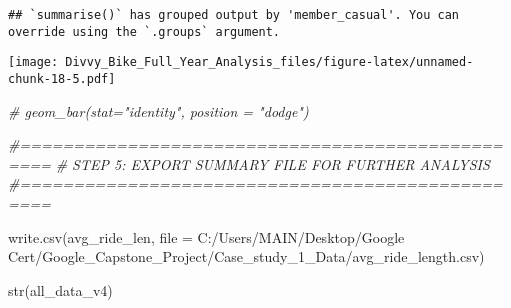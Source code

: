 \documentclass[
]{article}
\newenvironment{Shaded}{\begin{snugshade}}{\end{snugshade}}
\newcommand{\AttributeTok}[1]{\textcolor[rgb]{0.77,0.63,0.00}{#1}}
\newcommand{\CommentTok}[1]{\textcolor[rgb]{0.56,0.35,0.01}{\textit{#1}}}
\newcommand{\FunctionTok}[1]{\textcolor[rgb]{0.00,0.00,0.00}{#1}}
\newcommand{\NormalTok}[1]{#1}
\newcommand{\StringTok}[1]{\textcolor[rgb]{0.31,0.60,0.02}{#1}}
\begin{document}
\begin{verbatim}
## `summarise()` has grouped output by 'member_casual'. You can override using the `.groups` argument.
\end{verbatim}

\texttt{[image: Divvy\_Bike\_Full\_Year\_Analysis\_files/figure-latex/unnamed-chunk-18-5.pdf]}

\begin{Shaded}
\begin{Highlighting}[]
   \CommentTok{\# geom\_bar(stat="identity", position = "dodge")}
   
\CommentTok{\#=================================================}
\CommentTok{\# STEP 5: EXPORT SUMMARY FILE FOR FURTHER ANALYSIS}
\CommentTok{\#=================================================}
   
   \FunctionTok{write.csv}\NormalTok{(avg\_ride\_len, }\AttributeTok{file =} \StringTok{\textquotesingle{}C:/Users/MAIN/Desktop/Google Cert/Google\_Capstone\_Project/Case\_study\_1\_Data/avg\_ride\_length.csv\textquotesingle{}}\NormalTok{)}
   
   \FunctionTok{str}\NormalTok{(all\_data\_v4)}
\end{Highlighting}
\end{Shaded}
\end{document}
